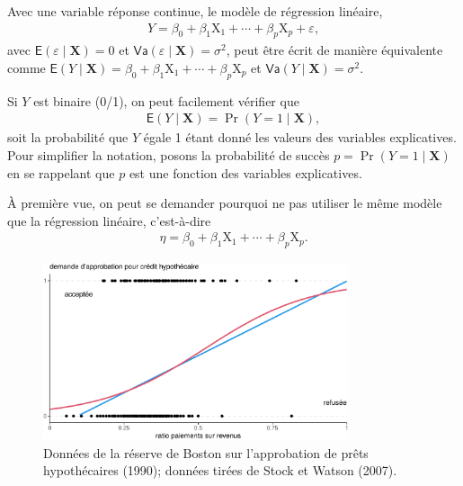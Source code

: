 \documentclass[
  11pt,
  letterpaper,
]{scrbook}
\theoremstyle{definition}
\theoremstyle{remark}
\begin{document}
Avec une variable réponse continue, le modèle de régression linéaire,
\begin{align*}
 Y = \beta_0 + \beta_1\mathrm{X}_1 + \cdots + \beta_p \mathrm{X}_p + \varepsilon,
\end{align*} avec \(\mathsf{E}(\varepsilon \mid \mathbf{X})=0\) et
\(\mathsf{Va}(\varepsilon \mid \mathbf{X})=\sigma^2\), peut être écrit
de manière équivalente comme
\(\mathsf{E}(Y \mid \mathbf{X}) = \beta_0 + \beta_1\mathrm{X}_1 + \cdots + \beta_p\mathrm{X}_p\)
et \(\mathsf{Va}(Y \mid \mathbf{X})=\sigma^2.\)

Si \(Y\) est binaire (0/1), on peut facilement vérifier que
\begin{align*}
\mathsf{E}(Y \mid \mathbf{X}) = \Pr(Y=1 \mid  \mathbf{X}),
\end{align*} soit la probabilité que \(Y\) égale 1 étant donné les
valeurs des variables explicatives. Pour simplifier la notation, posons
la probabilité de succès \(p = \Pr(Y=1 \mid \mathbf{X})\) en se
rappelant que \(p\) est une fonction des variables explicatives.

À première vue, on peut se demander pourquoi ne pas utiliser le même
modèle que la régression linéaire, c'est-à-dire \begin{align*}
\eta=\beta_0 + \beta_1\mathrm{X}_1 + \cdots + \beta_p \mathrm{X}_p.
\end{align*}

\begin{figure}[ht!]

{\centering \includegraphics[width=0.8\textwidth,height=\textheight]{./05-reglogistique_files/figure-pdf/fig-demandecredit-1.pdf}

}

\caption{\label{fig-demandecredit}Données de la réserve de Boston sur
l'approbation de prêts hypothécaires (1990); données tirées de Stock et
Watson (2007).}

\end{figure}
\end{document}
